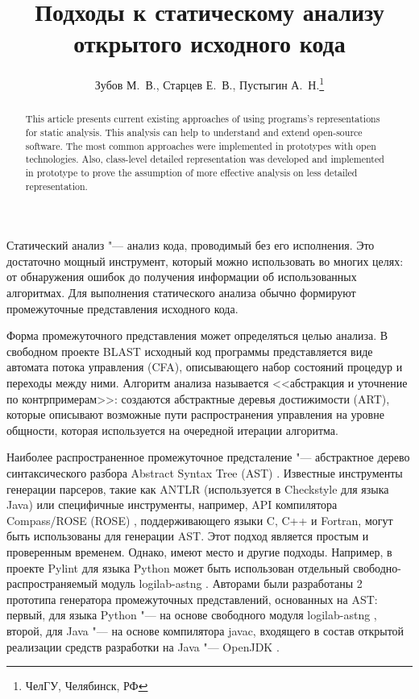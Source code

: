 \documentclass[10pt, a5paper]{article}
\begin{document}
\title{Подходы к статическому анализу открытого исходного кода}%

\author{Зубов М.~В., Старцев Е.~В., Пустыгин А.~Н.\footnote{ЧелГУ, Челябинск, РФ}}
\maketitle

\begin{abstract}
This article presents current existing approaches of using programs's representations for static analysis. This analysis can help to understand and extend open-source software. The most common approaches were implemented in prototypes with open technologies. Also, class-level detailed representation was developed and implemented in prototype to prove the assumption of more effective analysis on less detailed representation.
\end{abstract}

Статический анализ  "--- анализ кода, проводимый без его исполнения. Это достаточно мощный инструмент, который можно использовать во многих целях: от обнаружения ошибок до получения информации об использованных алгоритмах. Для выполнения статического анализа обычно формируют промежуточные представления исходного кода.

Форма промежуточного представления может определяться целью анализа. В свободном проекте BLAST \cite{Zubov1} исходный код программы представляется виде автомата потока управления (CFA), описывающего набор состояний процедур и переходы между ними. Алгоритм анализа называется <<абстракция и уточнение по  контрпримерам>>: создаются абстрактные деревья достижимости (ART), которые описывают возможные пути распространения управления на уровне общности, которая используется на очередной итерации алгоритма.

Наиболее распространенное промежуточное предсталение "--- абстрактное дерево синтаксического разбора Abstract Syntax Tree \linebreak(AST) \cite{Zubov2}. Известные инструменты генерации парсеров, такие как ANTLR \cite{Zubov3} (используется в Checkstyle \cite{Zubov4} для языка Java) или специфичные инструменты, например, API компилятора Compass/ROSE (ROSE) \cite{Zubov5}, поддерживающего языки C, C++ и Fortran, могут быть использованы для генерации AST. Этот подход является простым и проверенным временем. Однако, имеют место и другие подходы. Например, в проекте Pylint \cite{Zubov6} для языка Python может быть использован отдельный свободно-распространяемый модуль logilab-astng \cite{Zubov7}. Авторами были разработаны 2 прототипа генератора промежуточных представлений, основанных на AST: первый, для языка Python "--- на основе свободного модуля logilab-astng \cite{Zubov7}, второй, для Java "--- на основе компилятора javac, входящего в состав открытой реализации средств разработки на Java "--- OpenJDK \cite{Zubov8}.
\end{document}

